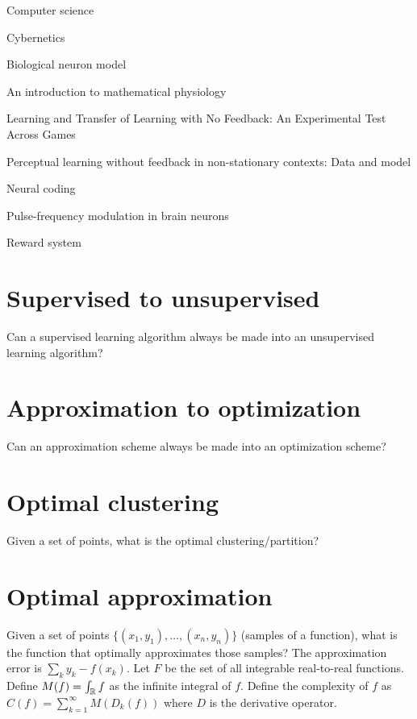 Computer science

Cybernetics


Biological neuron model

An introduction to mathematical physiology

Learning and Transfer of Learning with No Feedback: An Experimental Test Across Games

Perceptual learning without feedback in non-stationary contexts: Data and model

Neural coding

Pulse-frequency modulation in brain neurons

Reward system

\section{Supervised to unsupervised}

Can a supervised learning algorithm always be made into an unsupervised learning algorithm?

\section{Approximation to optimization}

Can an approximation scheme always be made into an optimization scheme?

\section{Optimal clustering}

Given a set of points, what is the optimal clustering/partition?

\section{Optimal approximation}

Given a set of points
\(\{(x_1,y_1),\ldots,(x_n,y_n)\}\)
(samples of a function),
what is the function that optimally approximates those samples?
The approximation error is \(\sum_k y_k - f(x_k) \).
Let \(F\) be the set of all integrable real-to-real functions.
Define \(M(f) = \int_{\mathbb{R}} f\) as the infinite integral of \(f\).
Define the complexity of \(f\)
as \(C(f) = \sum_{k=1}^\infty M(D_k(f))\)
where \(D\) is the derivative operator.

